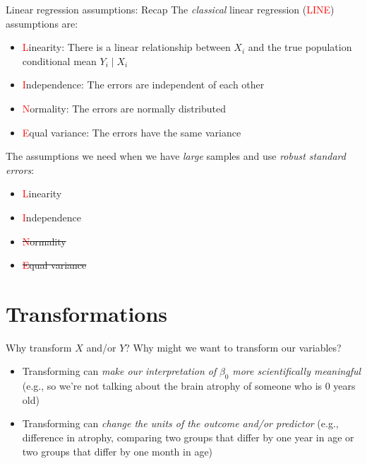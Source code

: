 \documentclass[10pt,t]{beamer}
\begin{document}
\begin{frame}{Linear regression assumptions: Recap}
The \textit{classical} linear regression (\textcolor{red}{LINE}) assumptions are:

\vspace{0.3cm}

\begin{itemize}
	\item \textcolor{red}{L}inearity: There is a linear relationship between $X_i$ and the true population conditional mean $Y_i \mid X_i$
	\item \textcolor{red}{I}ndependence: The errors are independent of each other
	\item \textcolor{red}{N}ormality: The errors are normally distributed
	\item \textcolor{red}{E}qual variance: The errors have the same variance
\end{itemize}

\vspace{0.3cm}

The assumptions we need when we have \textit{large} samples and use \textit{robust standard errors}:

\vspace{0.3cm}

\begin{itemize}
	\item \textcolor{red}{L}inearity
	\item \textcolor{red}{I}ndependence
	\item \sout{\textcolor{red}{N}ormality}
	\item \sout{\textcolor{red}{E}qual variance}
\end{itemize}

\end{frame}


\section{Transformations}

\begin{frame}{Why transform $X$ and/or $Y$?}
	Why might we want to transform our variables?
	\medskip
	
	\begin{itemize}
		\item Transforming can \textit{make our interpretation of} $\beta_0$ \textit{more scientifically meaningful} (e.g., so we're not talking about the brain atrophy of someone who is 0 years old)
		\medskip
		\item Transforming can \textit{change the units of the outcome and/or predictor} (e.g., difference in atrophy, comparing two groups that differ by one year in age or two groups that differ by one month in age)
	\end{itemize}
\end{frame}
\end{document}
